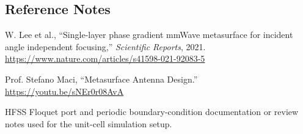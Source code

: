 \documentclass[10pt]{article}
\begin{document}
\subsection{Reference Notes}
\begin{enumerate}[label={[\arabic*]}]
    \item W. Lee et al., ``Single-layer phase gradient mmWave metasurface for incident angle independent focusing,'' \textit{Scientific Reports}, 2021. \url{https://www.nature.com/articles/s41598-021-92083-5}
    \item Prof. Stefano Maci, ``Metasurface Antenna Design.'' \url{https://youtu.be/sNEr0r08AvA}
    \item HFSS Floquet port and periodic boundary-condition documentation or review notes used for the unit-cell simulation setup.
\end{enumerate}

\nocite{*}


\end{document}
